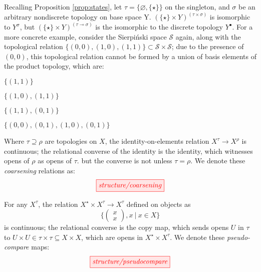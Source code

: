 \begin{example}[$\tau \multimap \sigma \nsubseteq \tau \times \sigma$]
Recalling Proposition \ref{prop:states}, let $\tau = \{\varnothing,\{\star\}\}$ on the singleton, and $\sigma$ be an arbitrary nondiscrete topology on base space Y. $(\{\star\} \times Y)^{(\tau \times \sigma)}$ is isomorphic to $Y^\sigma$, but $(\{\star\} \times Y)^{(\tau \multimap \sigma)}$ is the isomorphic to the discrete topology $Y^\bullet$. For a more concrete example, consider the Sierpi\'{n}ski space $\mathcal{S}$ again, along with the topological relation $\{(0,0),(1,0),(1,1)\} \subset \mathcal{S} \times \mathcal{S}$; due to the presence of $(0,0)$, this topological relation cannot be formed by a union of basis elements of the product topology, which are:
\begin{description}
\centering
\item[$\{1\} \times \{1\}$ =] $\{(1,1)\}$
\item[$\{1\} \times \{0,1\}$ =] $\{ (1,0),(1,1) \}$
\item[$\{0,1\} \times \{1\}$ =] $\{ (1,1),(0,1) \}$
\item[$\{0,1\} \times \{0,1\}$ =] $\{ (0,0), (0,1), (1,0), (0,1) \}$
\end{description}
\end{example}

\begin{defn}[Coarsening]\label{defn:coarsening}
Where $\tau \supseteq \rho$ are topologies on $X$, the identity-on-elements relation $X^\tau \rightarrow X^\rho$ is continuous; the relational converse of the identity is the identity, which witnesses opens of $\rho$ as opens of $\tau$. but the converse is not unless $\tau = \rho$. We denote these \emph{coarsening} relations as:
\[\tikzfig{structure/coarsening}\]
\end{defn}

\begin{defn}\label{defn:compare}
For any $X^\tau$, the relation $X^\star \times X^\tau \rightarrow X^\tau$ defined on objects as \[\{ \begin{pmatrix} x \\ x \end{pmatrix}, x \ | \ x \in X\}\] is continuous; the relational converse is the copy map, which sends opens $U$ in $\tau$ to $U \times U \in \tau \times \tau \subseteq X \times X$, which are opens in $X^\star \times X^\tau$. We denote these \emph{pseudo-compare} maps:
\[\tikzfig{structure/pseudocompare}\]
\end{defn}

